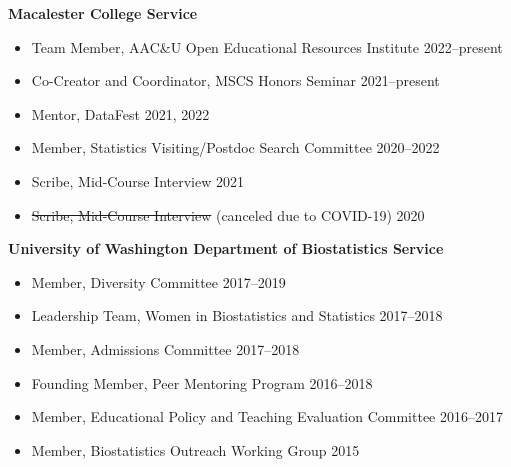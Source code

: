 \documentclass[margin]{res}
\begin{document}
\begin{resume}
\textbf{Macalester College Service}
	\begin{itemize} %
	\item Team Member, AAC\&U Open Educational Resources Institute \hfill 2022--present
	\item Co-Creator and Coordinator, MSCS Honors Seminar \hfill 2021--present
	\item Mentor, DataFest \hfill 2021, 2022
	\item Member, Statistics Visiting/Postdoc Search Committee \hfill 2020--2022
	\item Scribe, Mid-Course Interview \hfill 2021
	\item \sout{Scribe, Mid-Course Interview} (canceled due to COVID-19)  \hfill 2020 \\
	\end{itemize}


\textbf{University of Washington Department of Biostatistics Service}
\begin{itemize} %
	\item Member, Diversity Committee \hfill 2017--2019
	\item Leadership Team, Women in Biostatistics and Statistics \hfill 2017--2018
	\item Member, Admissions Committee \hfill 2017--2018
	\item Founding Member, Peer Mentoring Program \hfill 2016--2018
	\item Member, Educational Policy and Teaching Evaluation Committee \hfill 2016--2017
	\item Member, Biostatistics Outreach Working Group \hfill 2015\\
\end{itemize}


\end{resume}
\end{document}
